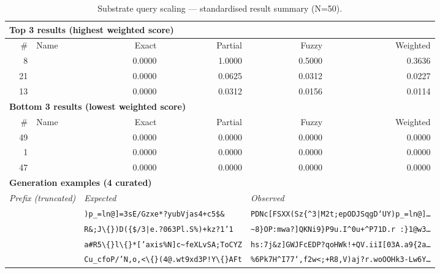 \begin{table}[htbp]
\centering
\caption{Substrate query scaling — standardised result summary (N=50).}
\label{tab:substrate_query_scaling_summary}
\begin{adjustbox}{max width=\textwidth}
\begin{tabular}{r p{5cm} r r r r}
\toprule
\multicolumn{6}{l}{\textbf{Top 3 results (highest weighted score)}} \\
\midrule
\# & Name & Exact & Partial & Fuzzy & Weighted \\
\midrule
8 &  & 0.0000 & 1.0000 & 0.5000 & 0.3636 \\
21 &  & 0.0000 & 0.0625 & 0.0312 & 0.0227 \\
13 &  & 0.0000 & 0.0312 & 0.0156 & 0.0114 \\
\midrule
\multicolumn{6}{l}{\textbf{Bottom 3 results (lowest weighted score)}} \\
\midrule
\# & Name & Exact & Partial & Fuzzy & Weighted \\
\midrule
49 &  & 0.0000 & 0.0000 & 0.0000 & 0.0000 \\
1 &  & 0.0000 & 0.0000 & 0.0000 & 0.0000 \\
47 &  & 0.0000 & 0.0000 & 0.0000 & 0.0000 \\
\midrule
\multicolumn{6}{l}{\textbf{Generation examples (4 curated)}} \\
\midrule
\multicolumn{2}{l}{\textit{Prefix (truncated)}} & \multicolumn{2}{l}{\textit{Expected}} & \multicolumn{2}{l}{\textit{Observed}} \\
\midrule
\multicolumn{2}{l}{\texttt{}} & \multicolumn{2}{l}{\texttt{)p\_=ln@]=3sE/Gzxe*?yubVjas4+c5\$\&}} & \multicolumn{2}{l}{\texttt{PDNc[FSXX(Sz\{\^{}3|M2t;epODJSqgD`UY)p\_=ln@]\ldots}} \\
\multicolumn{2}{l}{\texttt{}} & \multicolumn{2}{l}{\texttt{R\&;J\textbackslash\{\})D(\{\$/3|e.?063Pl.S\%)+kz?1'1}} & \multicolumn{2}{l}{\texttt{\textasciitilde{}8\}OP:mwa?]QKNi9\}P9u.I\^{}0u+\^{}P71D.r :\}1@w3\ldots}} \\
\multicolumn{2}{l}{\texttt{}} & \multicolumn{2}{l}{\texttt{a\#R5\textbackslash\{\}l\textbackslash\{\}*['axis\%N]c\textasciitilde{}feXLvSA;ToCYZ}} & \multicolumn{2}{l}{\texttt{hs:7j\&z]GWJFcEDP?qoHWk!+QV.iiI[03A.a9\{2a\ldots}} \\
\multicolumn{2}{l}{\texttt{}} & \multicolumn{2}{l}{\texttt{Cu\_cfoP/'N,o,<\textbackslash\{\}(4@.wt9xd3P!Y\textbackslash\{\}AFt}} & \multicolumn{2}{l}{\texttt{\%6Pk7H\^{}I77`,f2w<;+R8,V)aj?r.woOOHk3-Lw6Y\ldots}} \\

\end{tabular}
\end{adjustbox}
\end{table}
